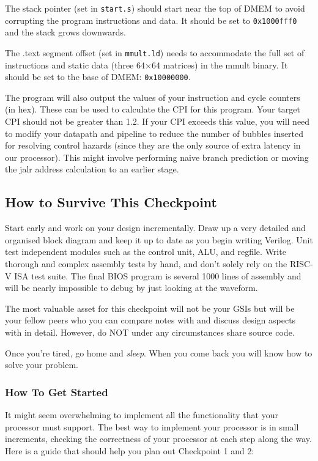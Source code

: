 \documentclass[11pt]{article}
\begin{document}
The stack pointer (set in \verb|start.s|) should start near the top of DMEM to avoid corrupting the program instructions and data.
It should be set to \verb|0x1000fff0| and the stack grows downwards.

The .text segment offset (set in \verb|mmult.ld|) needs to accommodate the full set of instructions and static data (three 64$\times$64 matrices) in the mmult binary.
It should be set to the base of DMEM: \verb|0x10000000|.

The program will also output the values of your instruction and cycle counters (in hex).
These can be used to calculate the CPI for this program.
Your target CPI should not be greater than 1.2.
If your CPI exceeds this value, you will need to modify your datapath and pipeline to reduce the number of bubbles inserted for resolving control hazards (since they are the only source of extra latency in our processor).
This might involve performing naive branch prediction or moving the jalr address calculation to an earlier stage.

\subsection{How to Survive This Checkpoint}
Start early and work on your design incrementally.
Draw up a very detailed and organised block diagram and keep it up to date as you begin writing Verilog.
Unit test independent modules such as the control unit, ALU, and regfile.
Write thorough and complex assembly tests by hand, and don't solely rely on the RISC-V ISA test suite.
The final BIOS program is several 1000 lines of assembly and will be nearly impossible to debug by just looking at the waveform.

The most valuable asset for this checkpoint will not be your GSIs but will be your fellow peers who you can compare notes with and discuss design aspects with in detail.
However, do NOT under any circumstances share source code.

Once you're tired, go home and \textit{sleep}. When you come back you will know how to solve your problem.

\subsubsection{How To Get Started}
It might seem overwhelming to implement all the functionality that your processor must support. The best way to implement your processor is in small increments, checking the correctness of your processor at each step along the way. Here is a guide that should help you plan out Checkpoint 1 and 2:
\end{document}
